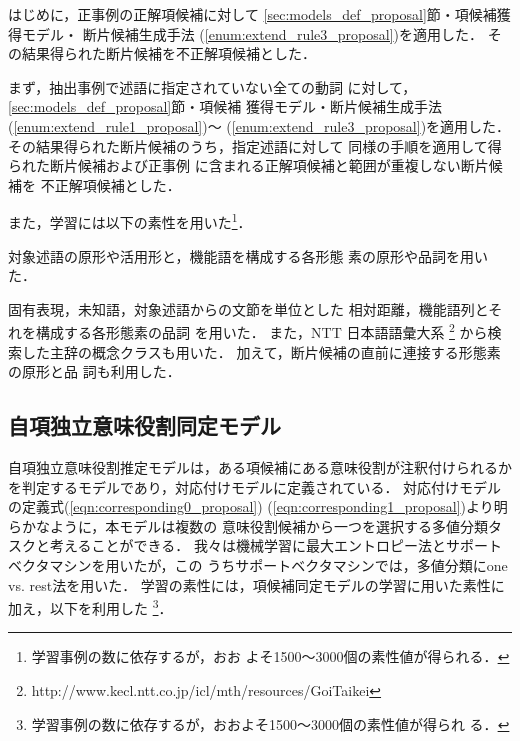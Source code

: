 \documentclass[japanese]{jnlp_1.2b}
\begin{document}
\begin{description}
 \setlength{\itemindent}{-6mm}
 \item[正解項候補の短縮伸長] $\;$\\
		       はじめに，正事例の正解項候補に対して
		       \ref{sec:models_def_proposal}節・項候補獲得モデル・
		       断片候補生成手法
		       (\ref{enum:extend_rule3_proposal})を適用した．
		       その結果得られた断片候補を不正解項候補とした．

 \item[非対象述語項の抽出と短縮伸長] $\;$\\
		       まず，抽出事例で述語に指定されていない全ての動詞
		       に対して，\ref{sec:models_def_proposal}節・項候補
		       獲得モデル・断片候補生成手法
		       (\ref{enum:extend_rule1_proposal})〜
		       (\ref{enum:extend_rule3_proposal})を適用した．
		       その結果得られた断片候補のうち，指定述語に対して
		       同様の手順を適用して得られた断片候補および正事例
		       に含まれる正解項候補と範囲が重複しない断片候補を
		       不正解項候補とした．
\end{description}
また，学習には以下の素性を用いた\footnote{学習事例の数に依存するが，おお
よそ1500〜3000個の素性値が得られる．}．


\begin{description}
 \setlength{\itemindent}{-6mm}
 \item[対象述語の素性] $\;$\\
		       対象述語の原形や活用形と，機能語を構成する各形態
		       素の原形や品詞を用いた．

 \item[対象断片候補の素性] $\;$\\
		       固有表現，未知語，対象述語からの文節を単位とした
		       相対距離，機能語列とそれを構成する各形態素の品詞
		       を用いた．
		       また，NTT 日本語語彙大系
		       \footnote{http://www.kecl.ntt.co.jp/icl/mth/resources/GoiTaikei}
		       から検索した主辞の概念クラスも用いた．
		       加えて，断片候補の直前に連接する形態素の原形と品
		       詞も利用した．
\end{description}



\subsection{自項独立意味役割同定モデル}
\label{sec:proposal_srt_indep}

自項独立意味役割推定モデルは，ある項候補にある意味役割が注釈付けられるか
を判定するモデルであり，対応付けモデルに定義されている．
対応付けモデルの定義式(\ref{eqn:corresponding0_proposal})
(\ref{eqn:corresponding1_proposal})より明らかなように，本モデルは複数の
意味役割候補から一つを選択する多値分類タスクと考えることができる．
我々は機械学習に最大エントロピー法とサポートベクタマシンを用いたが，この
うちサポートベクタマシンでは，多値分類にone vs. rest法を用いた．
学習の素性には，項候補同定モデルの学習に用いた素性に加え，以下を利用した
\footnote{学習事例の数に依存するが，おおよそ1500〜3000個の素性値が得られ
る．}．
\end{document}
